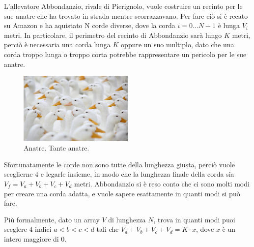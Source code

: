 \usepackage{xcolor}
\usepackage{afterpage}
\usepackage{pifont,mdframed}
\usepackage[bottom]{footmisc}
\usepackage{minted}

\newcommand{\inputfile}{\texttt{stdin}}
\newcommand{\outputfile}{\texttt{stdout}}
\makeatletter
\renewcommand{\this@inputfilename}{\texttt{stdin}}
\renewcommand{\this@outputfilename}{\texttt{stdout}}
\renewcommand{\this@syllabuslevel}{5}
\renewcommand{\this@custdifficulty}{3}
\makeatother
{}

L'allevatore Abbondanzio, rivale di Pierignolo, vuole costruire un recinto per le sue anatre che ha trovato in strada mentre scorrazzavano.
Per fare ciò si è recato su Amazon e ha aquistato N corde diverse, dove la corda $i = 0 \dots N-1$ è lunga $V_i$ metri.
In particolare, il perimetro del recinto di Abbondanzio sarà lungo $K$ metri, perciò è necessaria una corda lunga $K$
oppure un suo multiplo, dato che una corda troppo lunga o troppo corta potrebbe rappresentare un pericolo per le sue anatre.

\begin{figure}[h]
    \centering
    \includegraphics[width=0.5\textwidth]{duck.jpg}
    \caption{Anatre. Tante anatre.}
\end{figure}

Sfortunatamente le corde non sono tutte della lunghezza giusta, perciò vuole sceglierne $4$ e legarle insieme,
in modo che la lunghezza finale della corda sia $V_f = V_a + V_b + V_c + V_d$ metri.
Abbondanzio si è reso conto che ci sono molti modi per creare una corda adatta, e vuole sapere esattamente in quanti modi si può fare.

Più formalmente, dato un array $V$ di lunghezza $N$, trova in quanti modi puoi sceglere $4$ indici $a < b < c < d$ tali che
$V_a + V_b + V_c + V_d = K \cdot x$, dove $x$ è un intero maggiore di 0.


\Implementation

